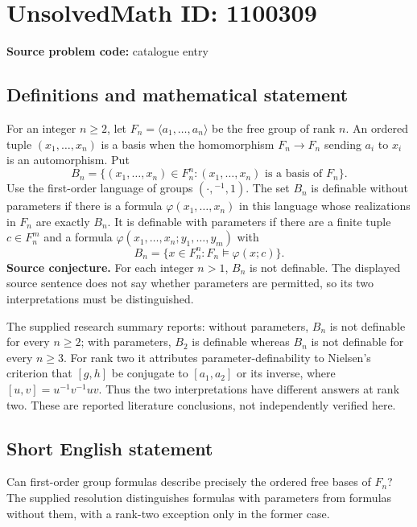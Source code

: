 \documentclass[11pt]{article}
\begin{document}
\section*{UnsolvedMath ID: 1100309}
\textbf{Source problem code:} catalogue entry
\subsection{Definitions and mathematical statement}
For an integer $n\geq2$, let $F_n=\langle a_1,\ldots,a_n\rangle$ be the free group of rank $n$. An ordered tuple $(x_1,\ldots,x_n)$ is a basis when the homomorphism $F_n\to F_n$ sending $a_i$ to $x_i$ is an automorphism. Put
\[
B_n=\{(x_1,\ldots,x_n)\in F_n^n:(x_1,\ldots,x_n)\text{ is a basis of }F_n\}.
\]
Use the first-order language of groups $(\cdot,{}^{-1},1)$. The set $B_n$ is definable without parameters if there is a formula $\varphi(x_1,\ldots,x_n)$ in this language whose realizations in $F_n$ are exactly $B_n$. It is definable with parameters if there are a finite tuple $c\in F_n^m$ and a formula $\varphi(x_1,\ldots,x_n;y_1,\ldots,y_m)$ with
\[
B_n=\{x\in F_n^n:F_n\models\varphi(x;c)\}.
\]
\textbf{Source conjecture.} For each integer $n>1$, $B_n$ is not definable. The displayed source sentence does not say whether parameters are permitted, so its two interpretations must be distinguished.

The supplied research summary reports: without parameters, $B_n$ is not definable for every $n\geq2$; with parameters, $B_2$ is definable whereas $B_n$ is not definable for every $n\geq3$. For rank two it attributes parameter-definability to Nielsen's criterion that $[g,h]$ be conjugate to $[a_1,a_2]$ or its inverse, where $[u,v]=u^{-1}v^{-1}uv$. Thus the two interpretations have different answers at rank two. These are reported literature conclusions, not independently verified here.
\subsection{Short English statement}
Can first-order group formulas describe precisely the ordered free bases of $F_n$? The supplied resolution distinguishes formulas with parameters from formulas without them, with a rank-two exception only in the former case.
\end{document}
